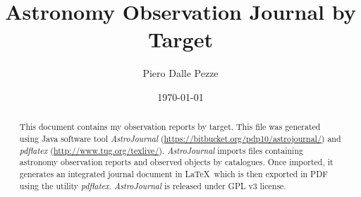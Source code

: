 \documentclass[10pt,twoside,a4paper,english]{article}
\title{Astronomy Observation Journal by Target}
\author{Piero Dalle Pezze}
\date{\today}
\begin{document}
\maketitle
\thispagestyle{empty}

\begin{abstract}
This document contains my observation reports by target. This file was generated using Java software tool {\it AstroJournal} (\href{https://bitbucket.org/pdp10/astrojournal/}{https://bitbucket.org/pdp10/astrojournal/}) and {\it pdflatex} (\href{http://www.tug.org/texlive/}{http://www.tug.org/texlive/}). {\it AstroJournal} imports files containing astronomy observation reports and observed objects by catalogues. Once imported, it generates an integrated journal document in \LaTeX\ which is then exported in PDF using the utility {\it pdflatex}. {\it AstroJournal} is released under GPL v3 license.
\end{abstract}

\tableofcontents


\clearpage


\small

\clearpage


\normalsize
\end{document}
